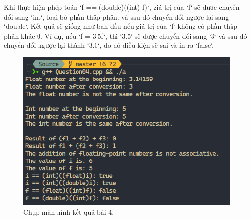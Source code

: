 Khi thực hiện phép toán `f == (double)((int) f)`, giá trị của `f` sẽ được chuyển đổi sang `int`, loại bỏ phần thập phân, và sau đó chuyển đổi ngược lại sang `double`. Kết quả sẽ giống như ban đầu nếu giá trị của `f` không có phần thập phân khác 0. Ví dụ, nếu `f = 3.5f`, thì `3.5` sẽ được chuyển đổi sang `3` và sau đó chuyển đổi ngược lại thành `3.0`, do đó điều kiện sẽ sai và in ra `false`.


\begin{figure}[H]
	\centering
	\includegraphics[width=\textwidth]{images/img4.PNG
	}
	\caption{Chụp màn hình kết quả bài 4.}
\end{figure}
